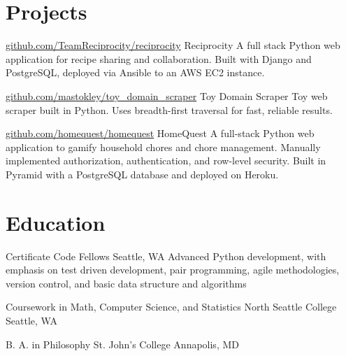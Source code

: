 \documentclass[10pt,a4paper,sans]{moderncv}        %
\begin{document}
\section{Projects}

\begin{comment}

  \cventry
  {date}
  {github url}
  {name}
  {}
  {}
  {description}

\end{comment}

{\href{http://github.com/TeamReciprocity/reciprocity}{github.com/TeamReciprocity/reciprocity}}
{Reciprocity} {} {} {A full stack Python web application for recipe sharing and
  collaboration. Built with Django and PostgreSQL, deployed via Ansible to an
  AWS EC2 instance.}

{\href{https://github.com/mastokley/toy_domain_scraper}{github.com/mastokley/toy\_domain\_scraper}}
{Toy Domain Scraper} {} {} {Toy web scraper built in Python. Uses breadth-first
  traversal for fast, reliable results.}

{\href{https://github.com/homequest/homequest}{github.com/homequest/homequest}}
{HomeQuest} {} {} {A full-stack Python web application to gamify household
  chores and chore management. Manually implemented authorization,
  authentication, and row-level security. Built in Pyramid with a PostgreSQL
  database and deployed on Heroku.}

\section{Education}
 {Certificate} {Code Fellows} {Seattle, WA} {} {Advanced Python
  development, with emphasis on test driven development, pair programming, agile
  methodologies, version control, and basic data structure and algorithms}

 {Coursework in Math, Computer Science, and Statistics}
{North Seattle College} {Seattle, WA} {} {}

 {B. A. in Philosophy} {St. John's College}
{Annapolis, MD} {} {}
\end{document}

